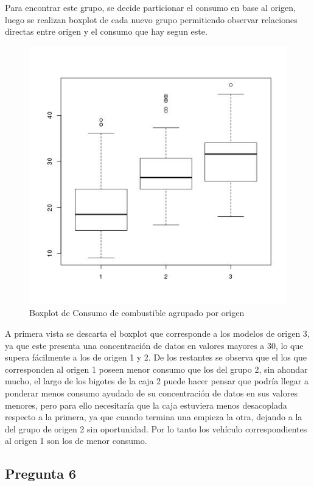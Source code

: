 \documentclass[letter,10pt]{article}
\begin{document}
Para encontrar este grupo, se decide particionar el consumo en base al origen, luego se realizan boxplot de cada nuevo grupo
permitiendo observar relaciones directas entre origen y el consumo que hay segun este.
\begin{figure}[h!]
    \centering
    \includegraphics[scale=0.5]{boxplot_mpg_origin.jpg}
    \caption{Boxplot de Consumo de combustible agrupado por origen}
    \label{fig:boxplot_mpg_origin}
\end{figure}
A primera vista se descarta el boxplot que corresponde a los modelos de origen 3, ya que este presenta una concentración de datos en valores
mayores a 30, lo que supera fácilmente a los de origen 1 y 2.
De los restantes se observa que el los que corresponden al origen 1 poseen menor consumo que los del grupo 2, sin ahondar mucho,
el largo de los bigotes de la caja 2 puede hacer pensar que podría llegar a ponderar menos consumo ayudado de su concentración de datos
en sus valores menores, pero para ello necesitaría que la caja estuviera menos desacoplada respecto a la primera, ya que cuando termina una empieza la otra,
dejando a la del grupo de origen 2 sin oportunidad. Por lo tanto los vehículo correspondientes al origen 1 son los de menor consumo.

\newpage
\subsection{Pregunta 6}
\end{document}

